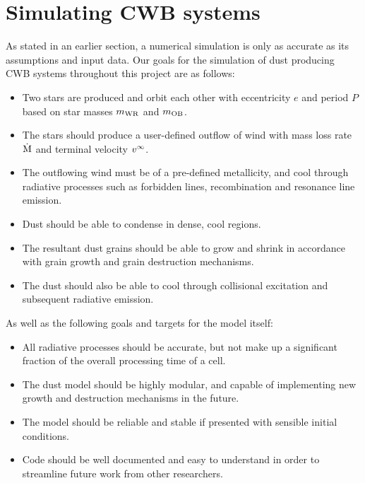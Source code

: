 \section{Simulating CWB systems}

As stated in an earlier section, a numerical simulation is only as accurate as its assumptions and input data.
Our goals for the simulation of dust producing CWB systems throughout this project are as follows:

\begin{itemize}
  \item Two stars are produced and orbit each other with eccentricity $e$ and period $P$ based on star masses $m_\text{WR}$ and $m_\text{OB}$.
  \item The stars should produce a user-defined outflow of wind with mass loss rate $\dot{\text{M}}$ and terminal velocity $v^\infty$.
  \item The outflowing wind must be of a pre-defined metallicity, and cool through radiative processes such as forbidden lines, recombination and resonance line emission.
  \item Dust should be able to condense in dense, cool regions.
  \item The resultant dust grains should be able to grow and shrink in accordance with grain growth and grain destruction mechanisms.
  \item The dust should also be able to cool through collisional excitation and subsequent radiative emission.
\end{itemize}

\noindent
As well as the following goals and targets for the model itself:

\begin{itemize}
  \item All radiative processes should be accurate, but not make up a significant fraction of the overall processing time of a cell.
  \item The dust model should be highly modular, and capable of implementing new growth and destruction mechanisms in the future.
  \item The model should be reliable and stable if presented with sensible initial conditions.
  \item Code should be well documented and easy to understand in order to streamline future work from other researchers.
\end{itemize}

